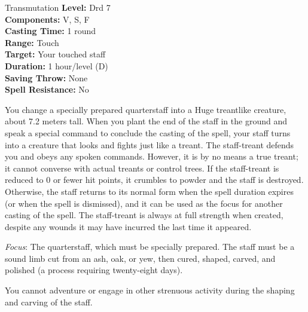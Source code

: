 {Transmutation}
{
	\textbf{Level:}
	Drd 7\\
	\textbf{Components:}
	V, S, F\\
	\textbf{Casting Time:}
	1 round\\
	\textbf{Range:}
	Touch\\
	\textbf{Target:}
	Your touched staff\\
	\textbf{Duration:}
	1 hour/level (D)\\
	\textbf{Saving Throw:}
	None\\
	\textbf{Spell Resistance:}
	No\\
}
{
	You change a specially prepared quarterstaff into a Huge treantlike creature, about 7.2 meters tall. When you plant the end of the staff in the ground and speak a special command to conclude the casting of the spell, your staff turns into a creature that looks and fights just like a treant. The staff-treant defends you and obeys any spoken commands. However, it is by no means a true treant; it cannot converse with actual treants or control trees. If the staff-treant is reduced to 0 or fewer hit points, it crumbles to powder and the staff is destroyed. Otherwise, the staff returns to its normal form when the spell duration expires (or when the spell is dismissed), and it can be used as the focus for another casting of the spell. The staff-treant is always at full strength when created, despite any wounds it may have incurred the last time it appeared.

	\textit{Focus}:
	The quarterstaff, which must be specially prepared. The staff must be a sound limb cut from an ash, oak, or yew, then cured, shaped, carved, and polished (a process requiring twenty-eight days).

	You cannot adventure or engage in other strenuous activity during the shaping and carving of the staff.

}
